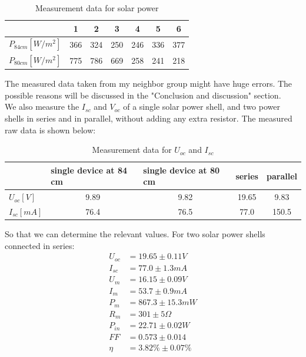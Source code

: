 \documentclass[12pt, a4paper]{article}
\begin{document}
\begin{table}[H]
	\begin{center}
		\begin{tabular}{|c|c|c|c|c|c|c|}
			\hline
							   & 1   & 2   & 3   & 4   & 5   & 6   \\ \hline
			$P_{84cm} [W/m^2]$ & 366 & 324 & 250 & 246 & 336 & 377 \\ \hline
			$P_{80cm} [W/m^2]$ & 775 & 786 & 669 & 258 & 241 & 218 \\ \hline
			\end{tabular}
			\caption{Measurement data for solar power}
	\end{center}
\end{table}

The measured data taken from my neighbor group might have huge errors. The \\ 
\noindent possible reasons will be discussed in the "Conclusion and discussion" section.\\

We also measure the $I_{sc}$ and $V_{oc}$ of a single solar power shell, and two power shells in 
series and in parallel, without adding any extra resistor. The measured raw data is shown below:
\begin{table}[H]
	\begin{center}
		\begin{tabular}{|l|c|c|c|c|}
		\hline
					  & \multicolumn{1}{l|}{single device at 84 cm} & \multicolumn{1}{l|}{single device at 80 cm} & \multicolumn{1}{l|}{series} & \multicolumn{1}{l|}{parallel} \\ \hline
		$U_{oc} [V]$  & 9.89                                        & 9.82                                        & 19.65                       & 9.83                          \\ \hline
		$I_{sc} [mA]$ & 76.4                                        & 76.5                                        & 77.0                        & 150.5                         \\ \hline
		\end{tabular}
		\caption{Measurement data for $U_{oc}$ and $I_{sc}$}
	\end{center}
\end{table}

So that we can determine the relevant values. For two solar power shells 
connected in series:
\begin{align*}
	U_{oc} &= 19.65\pm 0.11 V \\
	I_{sc} &= 77.0\pm 1.3 mA \\
	U_m &= 16.15\pm 0.09 V \\
	I_m &= 53.7\pm 0.9 mA \\
	P_m &= 867.3 \pm 15.3 mW \\
	R_m &= 301 \pm 5 \Omega \\
	P_{in} &= 22.71 \pm 0.02 W \\
	FF &= 0.573 \pm  0.014 \\
	\eta &= 3.82\% \pm 0.07 \% 
\end{align*}
\end{document}
